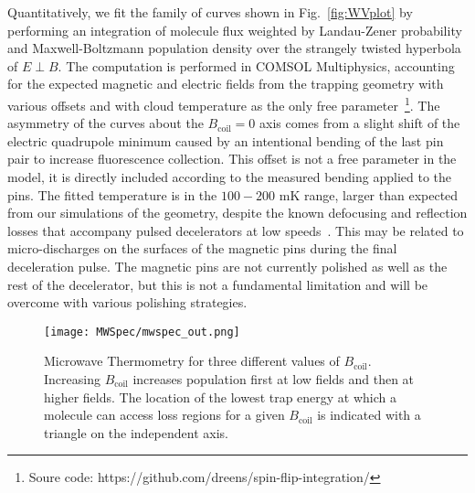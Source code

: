 \documentclass[%
 reprint,
groupedaddress,
 amsmath,amssymb,
 aps,
prl,
]{revtex4-1}
\newcommand{\epb}{{$E\!\perp\!B$}}
\begin{document}
Quantitatively, we fit the family of curves shown in Fig.~\ref{fig:WVplot} by performing an integration of molecule flux weighted by Landau-Zener probability and Maxwell-Boltzmann population density over the strangely twisted hyperbola of \epb. The computation is performed in COMSOL Multiphysics, accounting for the expected magnetic and electric fields from the trapping geometry with various offsets and with cloud temperature as the only free parameter~\footnote{Soure code: https://github.com/dreens/spin-flip-integration/}. The asymmetry of the curves about the $B_\text{coil}=0$ axis comes from a slight shift of the electric quadrupole minimum caused by an intentional bending of the last pin pair to increase fluorescence collection. This offset is not a free parameter in the model, it is directly included according to the measured bending applied to the pins. The fitted temperature is in the $100-200$ mK range, larger than expected from our simulations of the geometry, despite the known defocusing and reflection losses that accompany pulsed decelerators at low speeds~\cite{Sawyer2008a}. This may be related to micro-discharges on the surfaces of the magnetic pins during the final deceleration pulse. The magnetic pins are not currently polished as well as the rest of the decelerator, but this is not a fundamental limitation and will be overcome with various polishing strategies.

\begin{figure}[tb]
\texttt{[image: MWSpec/mwspec\_out.png]}%
\caption{
Microwave Thermometry for three different values of $B_\text{coil}$. Increasing $B_\text{coil}$ increases population first at low fields and then at higher fields. The location of the lowest trap energy at which a molecule can access loss regions for a given $B_\text{coil}$ is indicated with a triangle on the independent axis.
\label{fig:spec}}
\end{figure}
\end{document}
